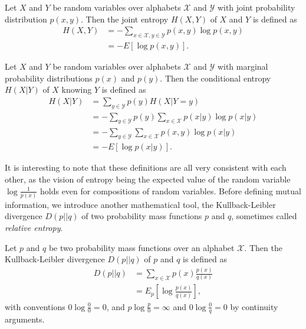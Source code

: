 \begin{definition}
    Let $X$ and $Y$ be random variables over alphabets $\mathcal{X}$ and $\mathcal{Y}$ with joint probability distribution $p(x, y)$. Then the joint entropy $H(X, Y)$ of $X$ and $Y$ is defined as
    \begin{align}
        H(X, Y) &= - \sum_{x \in \mathcal{X}, y \in \mathcal{Y}} p(x, y) \log p(x, y)\\
                &= - E[\log p(x, y)].
    \end{align}
\end{definition}

\begin{definition}
    Let $X$ and $Y$ be random variables over alphabets $\mathcal{X}$ and $\mathcal{Y}$ with marginal probability distributions $p(x)$ and $p(y)$. Then the conditional entropy $H(X|Y)$ of $X$ knowing $Y$ is defined as
    \begin{align}
        H(X|Y) &= \sum_{y \in \mathcal{Y}} p(y) H(X|Y = y)\\
                 &= - \sum_{y \in \mathcal{Y}} p(y) \sum_{x \in \mathcal{X}} p(x|y) \log p(x|y)\\
                 &= - \sum_{y \in \mathcal{Y}} \sum_{x \in \mathcal{X}} p(x, y) \log p(x|y)\\
                 &= - E[\log p(x|y)].
    \end{align}
\end{definition}

It is interesting to note that these definitions are all very consistent with each other, as the vision of entropy being the expected value of the random variable $\log \frac{1}{p(x)}$ holds even for compositions of random variables. Before defining mutual information, we introduce another mathematical tool, the Kullback-Leibler divergence $D(p||q)$ of two probability mass functions $p$ and $q$, sometimes called \textit{relative entropy}.

\begin{definition}
    Let $p$ and $q$ be two probability mass functions over an alphabet $\mathcal{X}$. Then the Kullback-Leibler divergence $D(p||q)$ of $p$ and $q$ is defined as
    \begin{align}
        D(p||q) &= \sum_{x \in \mathcal{X}} p(x) \frac{p(x)}{q(x)}\\
                &= E_p\left[\log \frac{p(x)}{q(x)}\right],
    \end{align}
    with conventions $0 \log \frac{0}{0} = 0$, and $p \log \frac{p}{0} = \infty$ and $0 \log \frac{0}{q} = 0$ by continuity arguments.
\end{definition}

